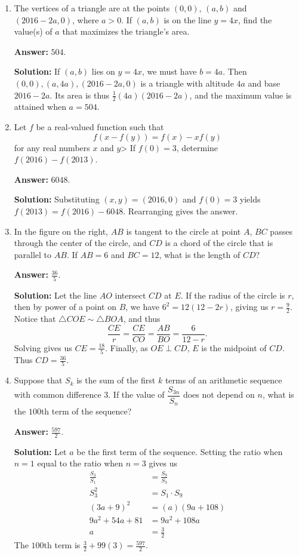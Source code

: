 \documentclass[11pt,paper=letter]{scrartcl}
\begin{document}
\begin{enumerate}[left=0pt]

\item The vertices of a triangle are at the points $(0, 0)$, $(a, b)$ and $(2016 - 2a, 0)$, where $a > 0$. If $(a, b)$ is on the line $y = 4x$, find the value(s) of $a$ that maximizes the triangle's area.

\textbf{Answer:} $\boxed{504}$.

\textbf{Solution:} If $(a, b)$ lies on $y = 4x$, we must have $b = 4a$. Then $(0, 0), (a, 4a), (2016 -2a, 0)$ is a triangle with altitude $4a$ and base $2016 - 2a$. Its area is thus $\frac{1}{2}(4a)(2016-2a)$, and the maximum value is attained when $a = 504$.

\item Let $f$ be a real-valued function such that $$f(x - f(y)) = f(x) - xf(y)$$ for any real numbers $x$ and $y$> If $f(0) = 3$, determine $f(2016) - f(2013)$.

\textbf{Answer:} $\boxed{6048}$.

\textbf{Solution:} Substituting $(x, y) = (2016, 0)$ and $f(0) = 3$ yields $f(2013) = f(2016) - 6048$. Rearranging gives the answer.

\item In the figure on the right, $AB$ is tangent to the circle at point $A$, $BC$ passes through the center of the circle, and $CD$ is a chord of the circle that is parallel to $AB$. If $AB = 6$ and $BC = 12$, what is the length of $CD$?

\textbf{Answer:} $\boxed{\frac{36}{5}}$.

\textbf{Solution:} Let the line $AO$ intersect $CD$ at $E$. If the radius of the circle is $r$, then by power of a point on $B$, we have $6^2 = 12(12 - 2r)$, giving us $r = \frac{9}{2}$. Notice that $\triangle COE \sim \triangle BOA$, and thus $$\frac{CE}{r} = \frac{CE}{CO} = \frac{AB}{BO} = \frac{6}{12 - r}.$$ Solving gives us $CE = \frac{18}{5}$. Finally, as $OE \perp CD$, $E$ is the midpoint of $CD$. Thus $CD = \frac{36}{5}$.

\item Suppose that $S_k$ is the sum of the first $k$ terms of an arithmetic sequence with common difference $3$. If the value of $\dfrac{S_{3n}}{S_n}$ does not depend on $n$, what is the $100$th term of the sequence?

\textbf{Answer:} $\boxed{\frac{597}{2}}$.

\textbf{Solution:} Let $a$ be the first term of the sequence. Setting the ratio when $n = 1$ equal to the ratio when $n = 3$ gives us
\begin{align*}
  \frac{S_3}{S_1} &= \frac{S_9}{S_3} \\
  S_3^2 &= S_1 \cdot S_9 \\
  (3a + 9)^2 &= (a)(9a + 108) \\
  9a^2 + 54a + 81 &= 9a^2 + 108a \\
  a &= \frac{3}{2}
\end{align*}
The $100$th term is $\frac{3}{2} + 99(3) = \frac{597}{2}$.


\end{enumerate}
\end{document}
